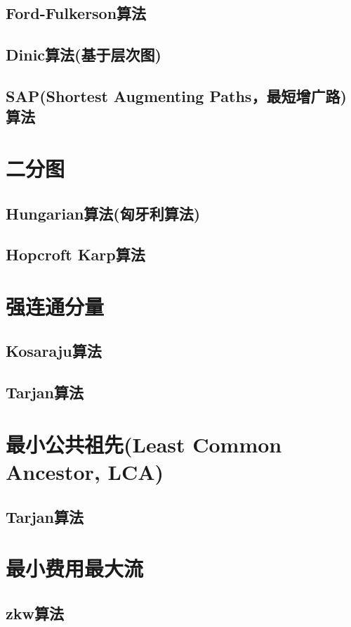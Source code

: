 \subsection{Ford-Fulkerson算法}
\subsection{Dinic算法(基于层次图)}
\subsection{SAP(Shortest Augmenting Paths，最短增广路)算法}

\section{二分图}
\subsection{Hungarian算法(匈牙利算法)}
\subsection{Hopcroft Karp算法}

\section{强连通分量}
\subsection{Kosaraju算法}
\subsection{Tarjan算法}

\section{最小公共祖先(Least Common Ancestor, LCA)}
\subsection{Tarjan算法}

\section{最小费用最大流}
\subsection{zkw算法}
